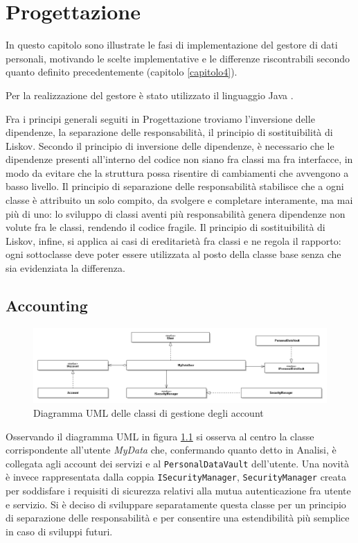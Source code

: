 \chapter{Progettazione}
\label{capitolo5}
\thispagestyle{empty}

\noindent In questo capitolo sono illustrate le fasi di implementazione del gestore di dati personali, motivando le scelte implementative e le differenze riscontrabili secondo quanto definito precedentemente (capitolo \ref{capitolo4}).

Per la realizzazione del gestore \`e stato utilizzato il linguaggio Java\cite{javalanguagespecs} \cite{java8api}.

Fra i principi generali seguiti in Progettazione troviamo l’inversione delle dipendenze, la separazione delle responsabilit\`a, il principio di sostituibilit\`a di Liskov. Secondo il principio di inversione delle dipendenze, \`e necessario che le dipendenze presenti all’interno del codice non siano fra classi ma fra interfacce, in modo da evitare che la struttura possa risentire di cambiamenti che avvengono a basso livello. Il principio di separazione delle responsabilit\`a stabilisce che a ogni classe \`e attribuito un solo compito, da svolgere e completare interamente, ma mai pi\`u di uno: lo sviluppo di classi aventi pi\`u responsabilit\`a genera dipendenze non volute fra le classi, rendendo il codice fragile. Il principio di sostituibilit\`a di Liskov, infine, si applica ai casi di ereditariet\`a fra classi e ne regola il rapporto: ogni sottoclasse deve poter essere utilizzata al posto della classe base senza che sia evidenziata la differenza.

\section{Accounting}
\label{sec:P-accounting}
\begin{figure} [h]
	\includegraphics[width=\linewidth]{pictures/Accounting-closed.png}
	\caption{Diagramma UML delle classi di gestione degli account}
	\label{fig:Accounting-closed}
\end{figure}
Osservando il diagramma UML in figura \ref{fig:Accounting-closed} si osserva al centro la classe corrispondente all’utente \textit{MyData} che, confermando quanto detto in Analisi, \`e collegata agli account dei servizi e al \texttt{PersonalDataVault} dell’utente. Una novit\`a \`e invece rappresentata dalla coppia \texttt{ISecurityManager}, \texttt{SecurityManager} creata per soddisfare i requisiti di sicurezza relativi alla mutua autenticazione fra utente e servizio. Si \`e deciso di sviluppare separatamente questa classe per un principio di separazione delle responsabilit\`a e per consentire una estendibilit\`a pi\`u semplice in caso di sviluppi futuri.

